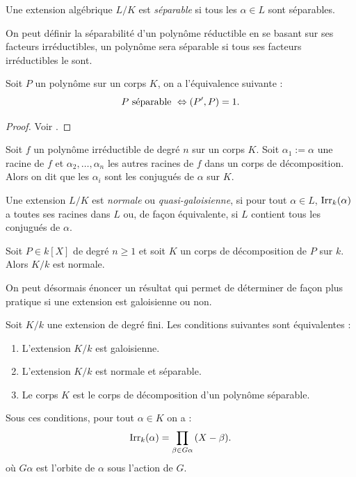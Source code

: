 \documentclass[a4paper]{article} %
\numberwithin{section}{part}
\numberwithin{equation}{section}
\newcommand\Irr[2]{\textup{Irr}_{#1}(#2)}
\begin{document}
\begin{defn}
\label{def:sep}
Une extension algébrique $L/K$ est \emph{séparable} si tous les $\alpha\in L$
sont séparables.
\end{defn}

\begin{rem}
On peut définir la séparabilité d'un polynôme réductible en se basant sur ses
facteurs irréductibles, un polynôme sera séparable si tous ses facteurs
irréductibles le sont.
\end{rem}

\begin{prop}
\label{prop:sepderiv}
Soit $P$ un polynôme sur un corps $K$, on a l'équivalence suivante 
:
\begin{equation}
    P\textup{ séparable } \Leftrightarrow (P', P) = 1.
\end{equation}
\end{prop}
\begin{proof}
    Voir \cite[]{Lan1}.
\end{proof}

Soit $f$ un polynôme irréductible de degré $n$ sur un corps $K$. Soit $\alpha_1 
:= \alpha$ une racine de $f$ et $\alpha_2,\dots,\alpha_n$ les autres racines de 
$f$ dans un corps de décomposition. Alors on dit que les $\alpha_i$ sont les 
conjugués de $\alpha$ sur $K$.
\begin{defn}
Une extension $L/K$ est \emph{normale} ou \emph{quasi-galoisienne}, si pour tout
$\alpha\in L$, $\Irr{k}{\alpha}$ a toutes ses racines dans $L$ ou, de façon 
équivalente, si $L$ contient tous les conjugués de $\alpha$.
\end{defn}

\begin{prop}
\label{prop:decompnorm}
Soit $P\in k[X]$ de degré $n\geq 1$ et soit $K$ un corps de décomposition de $P$
sur $k$. Alors $K/k$ est normale.
\end{prop}

On peut désormais énoncer un résultat qui permet de déterminer de façon plus
pratique si une extension est galoisienne ou non.

\begin{thm}
Soit $K/k$ une extension de degré fini. Les conditions suivantes sont
équivalentes :
\begin{enumerate}
\item L'extension $K/k$ est galoisienne.
\item L'extension $K/k$ est normale et séparable.
\item Le corps $K$ est le corps de décomposition d'un polynôme séparable.
\end{enumerate}
Sous ces conditions, pour tout $\alpha\in K$ on a :
\begin{equation}
\Irr{k}{\alpha} = \prod_{\beta\in G\alpha}{(X - \beta)}.
\end{equation}
où $G\alpha$ est l'orbite de $\alpha$ sous l'action de $G$.
\end{thm}
\end{document}
